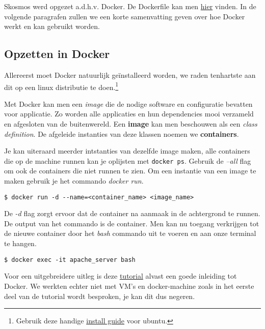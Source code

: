 Skosmos werd opgezet a.d.h.v. Docker. De Dockerfile kan men \href{https://github.com/lab9k/Skos/blob/master/Dockerfile}{hier} vinden. In de volgende paragrafen zullen we een korte samenvatting geven over hoe Docker werkt en kan gebruikt worden.

\subsection{Opzetten in Docker}
Allereerst moet Docker natuurlijk geïnstalleerd worden, we raden tenhartste aan dit op een linux distributie te doen.\footnote{Gebruik deze handige  \href{https://docs.docker.com/install/linux/docker-ce/ubuntu/}{install guide} voor ubuntu.}

Met Docker kan men een \textit{image} die de nodige software en configuratie bevatten voor applicatie. Zo worden alle applicaties en hun dependencies mooi verzameld en afgesloten van de buitenwereld. Een \textbf{image} kan men beschouwen als een \textit{class definition}. De afgeleide instanties van deze klassen noemen we \textbf{containers}.

Je kan uiteraard meerder intstanties van dezelfde image maken, alle containers die op de machine runnen kan je oplijsten met \texttt{docker ps}. Gebruik de \textit{--all} flag om ook de containers die niet runnen te zien. Om een instantie van een image te maken gebruik je het commando \textit{docker run}.

\begin{verbatim}
$ docker run -d --name=<container_name> <image_name>
\end{verbatim}

De \textit{-d} flag zorgt ervoor dat de container na aanmaak in de achtergrond te runnen. De output van het commando is de container. Men kan nu toegang verkrijgen tot de nieuwe container door het \textit{bash} commando uit te voeren en aan onze terminal te hangen.

\begin{verbatim}
$ docker exec -it apache_server bash
\end{verbatim}


Voor een uitgebreidere uitleg is deze \href{https://semaphoreci.com/community/tutorials/dockerizing-a-php-application}{tutorial} alvast een goede inleiding tot Docker. We werkten echter niet met VM's en docker-machine zoals in het eerste deel van de tutorial wordt besproken, je kan dit dus negeren. 


